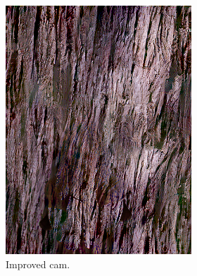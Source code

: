 \begin{figure}[]
\begin{subfigure}{\textwidth}
\begin{subfigure}{0.24\textwidth}
            \includegraphics[width=\textwidth]{images/04-experiment02/human/wood/improved_proj.jpg}
            \caption*{Improved cam.}
        \end{subfigure}
        \hfill
        \begin{subfigure}{0.24\textwidth}
            \centering

\end{subfigure}
\end{subfigure}
\end{figure}
